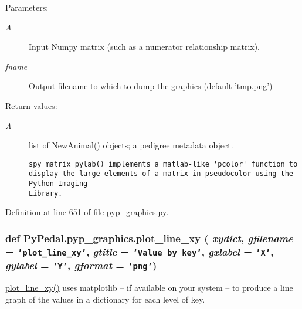 \begin{Desc}
\item[Parameters:]
\begin{description}
\item[{\em A}]Input Numpy matrix (such as a numerator relationship matrix). \item[{\em fname}]Output filename to which to dump the graphics (default 'tmp.png') \end{description}
\end{Desc}
\begin{Desc}
\item[Return values:]
\begin{description}
\item[{\em A}]list of New\-Animal() objects; a pedigree metadata object.

\footnotesize\begin{verbatim}spy_matrix_pylab() implements a matlab-like 'pcolor' function to
display the large elements of a matrix in pseudocolor using the Python Imaging
Library.
\end{verbatim}
\normalsize
 \end{description}
\end{Desc}


Definition at line 651 of file pyp\_\-graphics.py.\hypertarget{namespacePyPedal_1_1pyp__graphics_903c6e4a4b3fb7f015a9b827c26a3123}{
\subsubsection[plot\_\-line\_\-xy]{\setlength{\rightskip}{0pt plus 5cm}def Py\-Pedal.pyp\_\-graphics.plot\_\-line\_\-xy ( {\em xydict},  {\em gfilename} = {\tt 'plot\_\-line\_\-xy'},  {\em gtitle} = {\tt 'Value~by~key'},  {\em gxlabel} = {\tt 'X'},  {\em gylabel} = {\tt 'Y'},  {\em gformat} = {\tt 'png'})}}
\label{namespacePyPedal_1_1pyp__graphics_903c6e4a4b3fb7f015a9b827c26a3123}


\hyperlink{namespacePyPedal_1_1pyp__graphics_903c6e4a4b3fb7f015a9b827c26a3123}{plot\_\-line\_\-xy()} uses matplotlib -- if available on your system -- to produce a line graph of the values in a dictionary for each level of key. 

